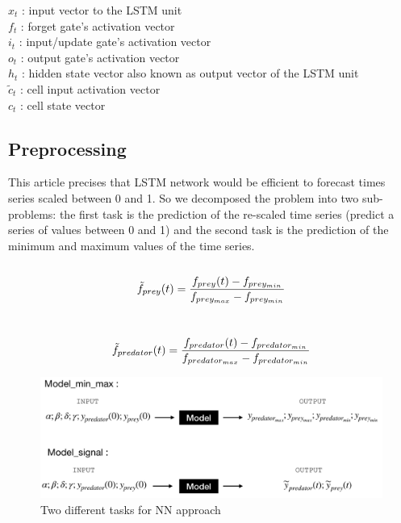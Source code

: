\documentclass{article}
\begin{document}
$x_t$ : input vector to the LSTM unit \\
$f_t$ : forget gate's activation vector\\
$i_t$ : input/update gate's activation vector\\
$o_t$ : output gate's activation vector\\
$h_t$ : hidden state vector also known as output vector of the LSTM unit\\
$\tilde{c}_t$ : cell input activation vector\\
$c_t $ : cell state vector\\



\subsection{Preprocessing}
This article precises that LSTM network would be efficient to forecast times series scaled between 0 and 1. So we decomposed the problem into two sub-problems: the first task is the prediction of the re-scaled time series (predict a series of values between 0 and 1) and the second task is the prediction of the minimum and maximum values of the time series. 
  \\  
  \\  
  \begin{equation}
      \Tilde{f}_{prey}(t) = \frac{f_{prey}(t)-f_{prey_{min}}}{f_{prey_{max}}-f_{prey_{min}}}
  \end{equation}

  \\  
 \begin{equation}
     \Tilde{f}_{predator}(t) = \frac{f_{predator}(t)-f_{predator_{min}}}{f_{predator_{max}}-f_{predator_{min}}}
 \end{equation}


\begin{figure}[H]
\centering
\includegraphics[scale=0.4]{image/models_explanation.png}
\caption{Two different tasks for NN approach}
\label{fig: Two models}
\end{figure}
\end{document}
